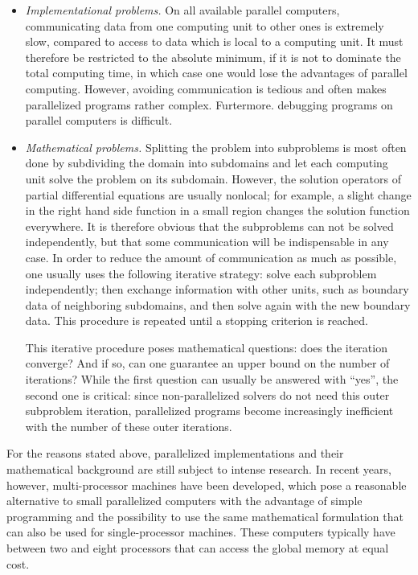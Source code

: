 \documentclass[11pt]{article}
\begin{document}
\begin{itemize}
\item \textit{Implementational problems.} On all available parallel computers,
communicating data from one computing unit to other ones is extremely slow,
compared to access to data which is local to a computing unit. It must
therefore be restricted to the absolute minimum, if it is not to dominate
the total computing time, in which case one would lose the advantages of
parallel computing. However, avoiding communication is tedious and often
makes parallelized programs rather complex. Furtermore. debugging programs
on parallel computers is difficult.

\item \textit{Mathematical problems.} Splitting the problem into subproblems
is most often done by subdividing the domain into subdomains and let each
computing unit solve the problem on its subdomain. However, the solution
operators of partial differential equations are usually nonlocal; for
example, a slight change in the right hand side function in a small region
changes the solution function everywhere. It is therefore obvious that the
subproblems can not be solved independently, but that some communication
will be indispensable in any case. In order to reduce the amount of
communication as much as possible, one usually uses the following iterative
strategy: solve each subproblem independently; then exchange information
with other units, such as boundary data of neighboring subdomains, and then
solve again with the new boundary data. This procedure is repeated until a
stopping criterion is reached.

This iterative procedure poses mathematical questions: does the iteration
converge? And if so, can one guarantee an upper bound on the number of
iterations? While the first question can usually be answered with ``yes'', the
second one is critical: since non-parallelized solvers do not need this outer
subproblem iteration, parallelized programs become increasingly inefficient
with the number of these outer iterations.
\end{itemize}

For the reasons stated above, parallelized implementations and their
mathematical background are still subject to intense research. In recent
years, however, multi-processor machines have been developed, which pose a
reasonable alternative to small parallelized computers with the advantage of
simple programming and the possibility to use the same mathematical
formulation that can also be used for single-processor machines. These
computers typically have between two and eight processors that can access the
global memory at equal cost. 
\end{document}
